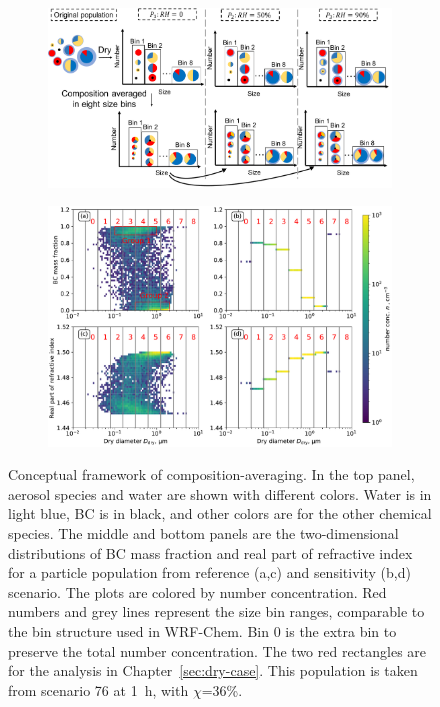 \documentclass[edeposit,fullpage]{uiucthesis2009}
\begin{document}
\begin{figure}
\centering
\begin{subfigure}{0.8\textwidth}
\includegraphics[scale=0.45]{chap4_figs/fig1.pdf}
\end{subfigure}
\begin{subfigure}{0.8\textwidth}
\includegraphics[scale=0.56]{chap4_figs/fig2.pdf}
\end{subfigure}
\caption{Conceptual framework of composition-averaging. In the top
  panel, aerosol species and water are shown with different
  colors. Water is in light blue, BC is in black, and other colors are
  for the other chemical species. The middle and bottom panels are the
  two-dimensional distributions of BC mass fraction and real part of
  refractive index for a particle population from reference (a,c) and
  sensitivity (b,d) scenario. The plots are colored by number
  concentration.  Red numbers and grey lines represent the size bin
  ranges, comparable to the bin structure used in WRF-Chem. Bin 0 is
  the extra bin to preserve the total number concentration. The two
  red rectangles are for the analysis in
  Chapter~\ref{sec:dry-case}. This population is taken from scenario
  76 at 1~h, with $\chi$=36\%.}
\label{fig1:scen}
\end{figure}
\end{document}
